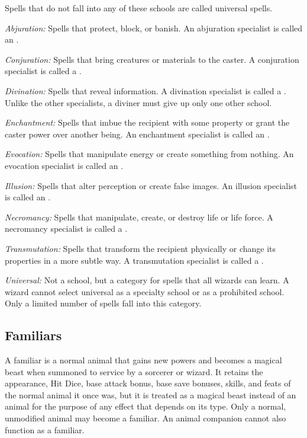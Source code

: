 Spells that do not fall into any of these schools are called universal spells.

\textit{Abjuration:} Spells that protect, block, or banish. An abjuration specialist 
is called an .

\textit{Conjuration:} Spells that bring creatures or materials to the caster. A 
conjuration specialist is called a .

\textit{Divination:} Spells that reveal information. A divination specialist is 
called a . Unlike the other specialists, a diviner must give up only one 
other school.

\textit{Enchantment:} Spells that imbue the recipient with some property or grant 
the caster power over another being. An enchantment specialist is called an .

\textit{Evocation:} Spells that manipulate energy or create something from nothing. 
An evocation specialist is called an .

\textit{Illusion:} Spells that alter perception or create false images. An illusion 
specialist is called an .

\textit{Necromancy:} Spells that manipulate, create, or destroy life or life force. 
A necromancy specialist is called a .

\textit{Transmutation:} Spells that transform the recipient physically or change 
its properties in a more subtle way. A transmutation specialist is called a .

\textit{Universal:} Not a school, but a category for spells that all wizards can 
learn. A wizard cannot select universal as a specialty school or as a prohibited 
school. Only a limited number of spells fall into this category.

\subsection{Familiars}

A familiar is a normal animal that gains new powers and becomes a magical beast 
when summoned to service by a sorcerer or wizard. It retains the appearance, Hit 
Dice, base attack bonus, base save bonuses, skills, and feats of the normal animal 
it once was, but it is treated as a magical beast instead of an animal for the 
purpose of any effect that depends on its type. Only a normal, unmodified animal 
may become a familiar. An animal companion cannot also function as a familiar.

